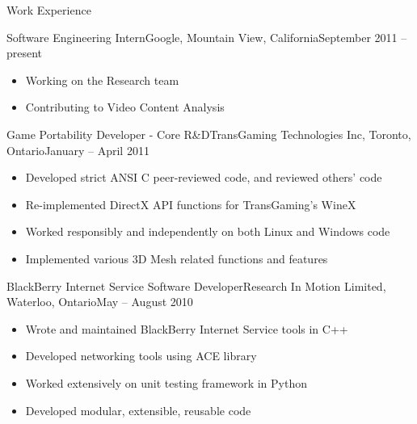 \documentclass[11pt]{article}
\begin{document}
    \begin{section}{Work Experience} \\

        \begin{subsection}{Software Engineering Intern}{Google, Mountain View, California}{September 2011 -- present}

            \begin{itemize}
                \item Working on the Research team
                \item Contributing to Video Content Analysis
            \end{itemize}

        \end{subsection}
        \begin{subsection}{Game Portability Developer - Core R\&D}{TransGaming Technologies Inc, Toronto, Ontario}{January -- April 2011}

            \begin{itemize}
                \item Developed strict ANSI C peer-reviewed code, and reviewed others' code
                \item Re-implemented DirectX API functions for TransGaming's WineX
                \item Worked responsibly and independently on both Linux and Windows code
                \item Implemented various 3D Mesh related functions and features
            \end{itemize}

        \end{subsection}
        \begin{subsection}{BlackBerry Internet Service Software Developer}{Research In Motion Limited, Waterloo, Ontario}{May -- August 2010}

            \begin{itemize}
                \item Wrote and maintained BlackBerry Internet Service tools in C++
                \item Developed networking tools using ACE library
                \item Worked extensively on unit testing framework in Python
                \item Developed modular, extensible, reusable code
            \end{itemize}


\end{subsection}
\end{section}
\end{document}
